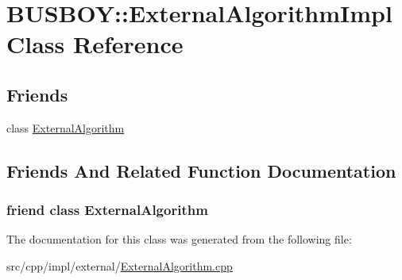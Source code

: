 \hypertarget{classBUSBOY_1_1ExternalAlgorithmImpl}{
\section{BUSBOY::ExternalAlgorithmImpl Class Reference}
\label{classBUSBOY_1_1ExternalAlgorithmImpl}
}
\subsection*{Friends}
\begin{DoxyCompactItemize}
\item 
class \hyperlink{classBUSBOY_1_1ExternalAlgorithmImpl_aec033ed8105813180a74c18fb1f108d0}{ExternalAlgorithm}
\end{DoxyCompactItemize}


\subsection{Friends And Related Function Documentation}
\hypertarget{classBUSBOY_1_1ExternalAlgorithmImpl_aec033ed8105813180a74c18fb1f108d0}{
\subsubsection[{ExternalAlgorithm}]{\setlength{\rightskip}{0pt plus 5cm}friend class {\bf ExternalAlgorithm}}}
\label{classBUSBOY_1_1ExternalAlgorithmImpl_aec033ed8105813180a74c18fb1f108d0}


The documentation for this class was generated from the following file:\begin{DoxyCompactItemize}
\item 
src/cpp/impl/external/\hyperlink{ExternalAlgorithm_8cpp}{ExternalAlgorithm.cpp}\end{DoxyCompactItemize}
